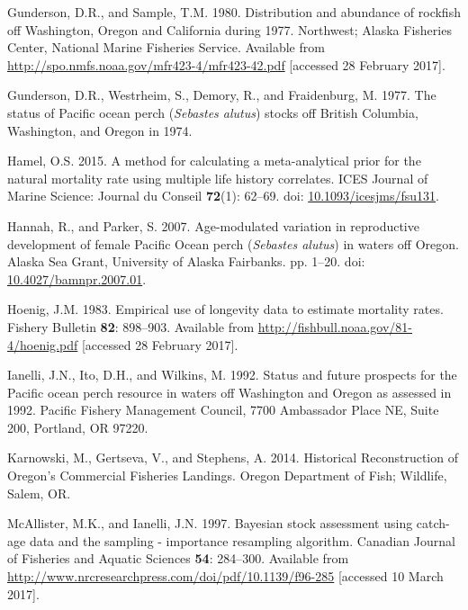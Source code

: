 \documentclass[12pt,]{article}
\begin{document}
\hypertarget{ref-gunderson_distribution_1980}{}
Gunderson, D.R., and Sample, T.M. 1980. Distribution and abundance of
rockfish off Washington, Oregon and California during 1977. Northwest;
Alaska Fisheries Center, National Marine Fisheries Service. Available
from \url{http://spo.nmfs.noaa.gov/mfr423-4/mfr423-42.pdf} {[}accessed
28 February 2017{]}.

\hypertarget{ref-gunderson_status_1977}{}
Gunderson, D.R., Westrheim, S., Demory, R., and Fraidenburg, M. 1977.
The status of Pacific ocean perch (\emph{Sebastes alutus}) stocks off
British Columbia, Washington, and Oregon in 1974.

\hypertarget{ref-hamel_method_2015}{}
Hamel, O.S. 2015. A method for calculating a meta-analytical prior for
the natural mortality rate using multiple life history correlates. ICES
Journal of Marine Science: Journal du Conseil \textbf{72}(1): 62--69.
doi:
\href{https://doi.org/10.1093/icesjms/fsu131}{10.1093/icesjms/fsu131}.

\hypertarget{ref-hannah_age-modulated_2007}{}
Hannah, R., and Parker, S. 2007. Age-modulated variation in reproductive
development of female Pacific Ocean perch (\emph{Sebastes alutus}) in
waters off Oregon. Alaska Sea Grant, University of Alaska Fairbanks. pp.
1--20. doi:
\href{https://doi.org/10.4027/bamnpr.2007.01}{10.4027/bamnpr.2007.01}.

\hypertarget{ref-hoenig_empirical_1983}{}
Hoenig, J.M. 1983. Empirical use of longevity data to estimate mortality
rates. Fishery Bulletin \textbf{82}: 898--903. Available from
\url{http://fishbull.noaa.gov/81-4/hoenig.pdf} {[}accessed 28 February
2017{]}.

\hypertarget{ref-ianelli_status_1992}{}
Ianelli, J.N., Ito, D.H., and Wilkins, M. 1992. Status and future
prospects for the Pacific ocean perch resource in waters off Washington
and Oregon as assessed in 1992. Pacific Fishery Management Council, 7700
Ambassador Place NE, Suite 200, Portland, OR 97220.

\hypertarget{ref-karnowski_historical_2014}{}
Karnowski, M., Gertseva, V., and Stephens, A. 2014. Historical
Reconstruction of Oregon's Commercial Fisheries Landings. Oregon
Department of Fish; Wildlife, Salem, OR.

\hypertarget{ref-mcallister_bayesian_1997}{}
McAllister, M.K., and Ianelli, J.N. 1997. Bayesian stock assessment
using catch-age data and the sampling - importance resampling algorithm.
Canadian Journal of Fisheries and Aquatic Sciences \textbf{54}:
284--300. Available from
\url{http://www.nrcresearchpress.com/doi/pdf/10.1139/f96-285}
{[}accessed 10 March 2017{]}.
\end{document}
